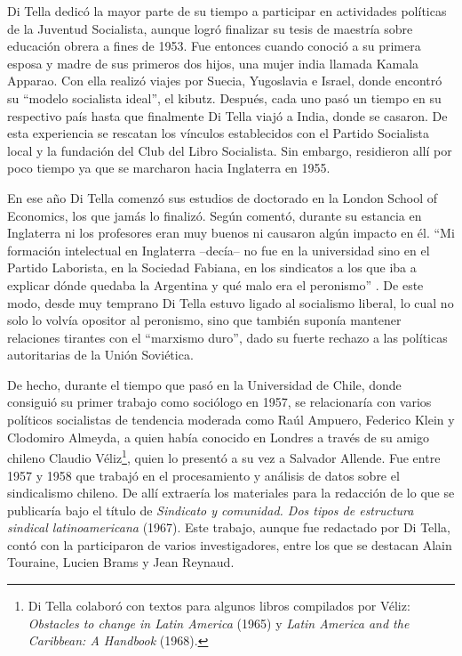Di Tella dedicó la mayor parte de su tiempo a participar en actividades políticas de la Juventud Socialista, aunque logró finalizar su tesis de maestría sobre educación obrera a fines de 1953. Fue entonces cuando conoció a su primera esposa y madre de sus primeros dos hijos, una mujer india llamada Kamala Apparao. Con ella realizó viajes por Suecia, Yugoslavia e Israel, donde encontró su \enquote{modelo socialista ideal}, el kibutz. Después, cada uno pasó un tiempo en su respectivo país hasta que finalmente Di Tella viajó a India, donde se casaron. De esta experiencia se rescatan los vínculos establecidos con el Partido Socialista local y la fundación del Club del Libro Socialista. Sin embargo, residieron allí por poco tiempo ya que se marcharon hacia Inglaterra en 1955.

En ese año Di Tella comenzó sus estudios de doctorado en la London School of Economics, los que jamás lo finalizó. Según comentó, durante su estancia en Inglaterra ni los profesores eran muy buenos ni causaron algún impacto en él. \enquote{Mi formación intelectual en Inglaterra --decía-- no fue en la universidad sino en el Partido Laborista, en la Sociedad Fabiana, en los sindicatos a los que iba a explicar dónde quedaba la Argentina y qué malo era el peronismo} \parencite[270]{1553-CAMOU2009}. De este modo, desde muy temprano Di Tella estuvo ligado al socialismo liberal, lo cual no solo lo volvía opositor al peronismo, sino que también suponía mantener relaciones tirantes con el \enquote{marxismo duro}, dado su fuerte rechazo a las políticas autoritarias de la Unión Soviética.

De hecho, durante el tiempo que pasó en la Universidad de Chile, donde consiguió su primer trabajo como sociólogo en 1957, se relacionaría con varios políticos socialistas de tendencia moderada como Raúl Ampuero, Federico Klein y Clodomiro Almeyda, a quien había conocido en Londres a través de su amigo chileno Claudio Véliz\footnote{Di Tella colaboró con textos para algunos libros compilados por Véliz: \emph{Obstacles to change in Latin America} (1965) y \emph{Latin America and the Caribbean: A Handbook} (1968).}, quien lo presentó a su vez a Salvador Allende. Fue entre 1957 y 1958 que trabajó en el procesamiento y análisis de datos sobre el sindicalismo chileno. De allí extraería los materiales para la redacción de lo que se publicaría bajo el título de \emph{Sindicato y comunidad. Dos tipos de estructura sindical latinoamericana} (1967). Este trabajo, aunque fue redactado por Di Tella, contó con la participaron de varios investigadores, entre los que se destacan Alain Touraine, Lucien Brams y Jean Reynaud.

